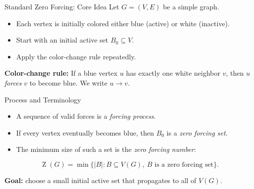\documentclass{beamer}
\newcommand{\abs}[1]{\left\vert#1\right\vert}
\theoremstyle{definition}
\DeclareMathOperator{\Z}{Z}
\begin{document}


\begin{frame}{Standard Zero Forcing: Core Idea}
\small
Let $G=(V,E)$ be a simple graph.
\begin{itemize}
  \item Each vertex is initially colored either blue (active) or white (inactive).
  \item Start with an initial active set $B_0\subseteq V$.
  \item Apply the color-change rule repeatedly.
\end{itemize}

\vspace{0.2em}
\textbf{Color-change rule:} If a blue vertex $u$ has exactly one white neighbor $v$, then $u$ \emph{forces} $v$ to become blue. We write $u\to v$.
\end{frame}

\begin{frame}{Process and Terminology}
\small
\begin{itemize}
  \item A sequence of valid forces is a \emph{forcing process}.
  \item If every vertex eventually becomes blue, then $B_0$ is a \emph{zero forcing set}.
  \item The minimum size of such a set is the \emph{zero forcing number}:
\end{itemize}

\[
\Z(G)=\min\{\abs{B}: B\subseteq V(G),\ B \text{ is a zero forcing set}\}.
\]

\vspace{0.2em}
\textbf{Goal:} choose a small initial active set that propagates to all of $V(G)$.
\end{frame}
\end{document}
